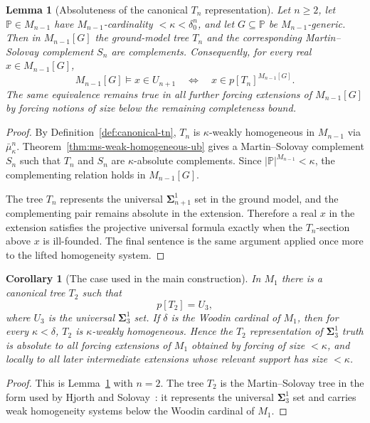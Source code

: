 \documentclass[a4paper,11pt]{article}
\newtheorem{lemma}[theorem]{Lemma}
\newtheorem{corollary}[theorem]{Corollary}
\begin{document}
\begin{lemma}[Absoluteness of the canonical $T_n$ representation]\label{lem:tn-small-generic-absoluteness}
Let $n\geq 2$, let $\mathbb P\in M_{n-1}$ have $M_{n-1}$-cardinality $<\kappa<\delta^n_0$, and let $G\subseteq\mathbb P$ be $M_{n-1}$-generic.  Then in $M_{n-1}[G]$ the ground-model tree $T_n$ and the corresponding Martin--Solovay complement $S_n$ are complements.  Consequently, for every real $x\in M_{n-1}[G]$,
\[
   M_{n-1}[G]\models x\in U_{n+1}
   \quad\Longleftrightarrow\quad
   x\in p[T_n]^{M_{n-1}[G]} .
\]
The same equivalence remains true in all further forcing extensions of $M_{n-1}[G]$ by forcing notions of size below the remaining completeness bound.
\end{lemma}

\begin{proof}
By Definition~\ref{def:canonical-tn}, $T_n$ is $\kappa$-weakly homogeneous in $M_{n-1}$ via $\bar\mu^n_\kappa$.  Theorem~\ref{thm:ms-weak-homogeneous-ub} gives a Martin--Solovay complement $S_n$ such that $T_n$ and $S_n$ are $\kappa$-absolute complements.  Since $|\mathbb P|^{M_{n-1}}<\kappa$, the complementing relation holds in $M_{n-1}[G]$.

The tree $T_n$ represents the universal $\boldsymbol\Sigma^1_{n+1}$ set in the ground model, and the complementing pair remains absolute in the extension.  Therefore a real $x$ in the extension satisfies the projective universal formula exactly when the $T_n$-section above $x$ is ill-founded.  The final sentence is the same argument applied once more to the lifted homogeneity system.
\end{proof}

\begin{corollary}[The case used in the main construction]\label{cor:t2-sigma13-absoluteness}
In $M_1$ there is a canonical tree $T_2$ such that
\[
   p[T_2]=U_3,
\]
where $U_3$ is the universal $\boldsymbol\Sigma^1_3$ set.  If $\delta$ is the Woodin cardinal of $M_1$, then for every $\kappa<\delta$, $T_2$ is $\kappa$-weakly homogeneous.  Hence the $T_2$ representation of $\boldsymbol\Sigma^1_3$ truth is absolute to all forcing extensions of $M_1$ obtained by forcing of size $<\kappa$, and locally to all later intermediate extensions whose relevant support has size $<\kappa$.
\end{corollary}

\begin{proof}
This is Lemma~\ref{lem:tn-small-generic-absoluteness} with $n=2$.  The tree $T_2$ is the Martin--Solovay tree in the form used by Hjorth and Solovay~\cite{martin1969basis,Hjorth}: it represents the universal $\boldsymbol\Sigma^1_3$ set and carries weak homogeneity systems below the Woodin cardinal of $M_1$.
\end{proof}
\end{document}
